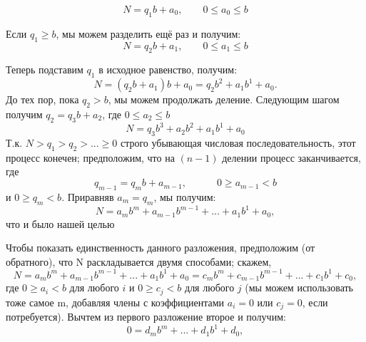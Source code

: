 \documentclass[11pt]{article}
\begin{document}
	\[N = q_1b+a_0, \qquad 0 \leq a_{0}\leq b\]
	
	Если $q_{1}\geq b $, мы можем разделить ещё раз и получим:
	\[N = q_2b+a_1, \qquad 0 \leq a_{1}\leq b\]  
	
	\thispagestyle{fancy}
	\rhead{\thepage}
	Теперь подставим $q_1$ в исходное равенство, получим: \[N = (q_{2}b+a_{1})b + a_{0} = q_{2}b^{2} + a_{1}b^{1} + a_{0} .\]
	До тех пор, пока $q_{2}>b$, мы можем продолжать деление. Следующим шагом получим ${q_{2}=q_{3}b+a_{2}}$, где ${0\leq a_{2} \leq b}$   
	\[N = q_{3}b^{3} + a_{2}b^{2} + a_{1}b^{1} + a_{0}\]
	Т.к.  $N > q_{1} > q_{2} >...\geq 0$ строго убывающая числовая последовательность, этот процесс конечен; предположим, что на $(n-1)$ делении процесс заканчивается, где \[q_{m-1} = q_{m}b + a_{m-1}, \qquad \quad  0\geq a_{m-1}<b \]
	и $0 \geq q_{m} < b$. Приравняв $a_{m} = q_{m}$, мы получим: \[N = a_{m}b^{m} + a_{m-1}b^{m-1} + ... +a_{1}b^{1} + a_{0},\] что и было нашей целью
	
	Чтобы показать единственность данного разложения, предположим (от обратного), что N раскладывается двумя способами; скажем,\[N = a_{m}b^{m} + a_{m-1}b^{m-1} + ... +a_{1}b^{1} + a_{0} = c_{m}b^{m} + c_{m-1}b^{m-1} + ... +c_{1}b^{1} + c_{0},\] где $ 0 \geq a_{i} < b$ для любого $i$ и $0 \geq c_{j} < b$ для любого $j$ (мы можем использовать тоже самое m, добавляя члены с коэффициентами $a_{i} = 0$ или $c_{j} = 0$, если потребуется). Вычтем из первого разложение второе и получим: \[0 = d_{m}b^{m} + ... + d_{1}b^{1} + d_0,\]
	
\end{document}
